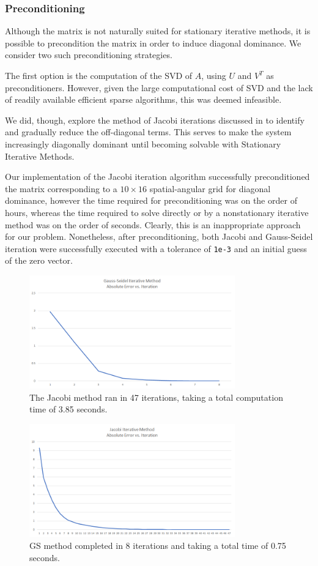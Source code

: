 \documentclass[10pt]{article}
\begin{document}
\begin{multicols}{2}
\subsubsection{Preconditioning}

Although the matrix is not naturally suited for stationary iterative methods, it is possible to precondition the matrix in order to induce diagonal dominance.
We consider two such preconditioning strategies.

The first option is the computation of the SVD of $A$, using $U$ and $V^T$ as preconditioners.
However, given the large computational cost of SVD and the lack of readily available efficient sparse algorithms, this was deemed infeasible.

We did, though, explore the method of Jacobi iterations discussed in \citet{yuan_method_2006} to identify and gradually reduce the off-diagonal terms.
This serves to make the system increasingly diagonally dominant until becoming solvable with Stationary Iterative Methods.
 
Our implementation of the Jacobi iteration algorithm successfully preconditioned the matrix corresponding to a $10\times 16$ spatial-angular grid for diagonal dominance, however the time required for preconditioning was on the order of hours, whereas the time required to solve directly or by a nonstationary iterative method was on the order of seconds.
Clearly, this is an inappropriate approach for our problem.
Nonetheless, after preconditioning, both Jacobi and Gauss-Seidel iteration were successfully executed with a tolerance of \texttt{1e-3} and an initial guess of the zero vector.

\begin{figure}[H]
	\centering
	\includegraphics[width=3.5in]{../img/fred_stat_it/img1.png}
	\caption{The Jacobi method ran in 47 iterations, taking a total computation time of 3.85 seconds.}
\end{figure}

\begin{figure}[H]
	\centering
	\includegraphics[width=3.5in]{../img/fred_stat_it/img2.png}
	\caption{GS method completed in 8 iterations and taking a total time of 0.75 seconds.}
\end{figure}


\end{multicols}
\end{document}
